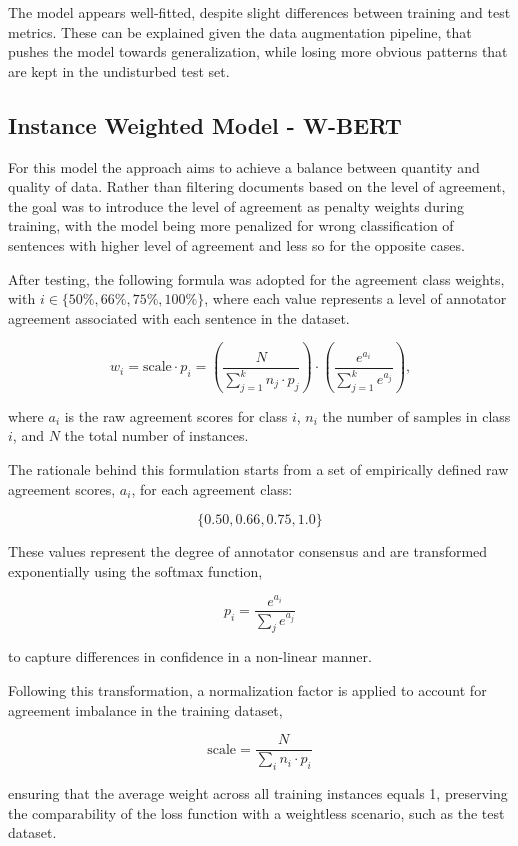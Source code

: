 \documentclass[conference]{IEEEtran}
\begin{document}
The model appears well-fitted, despite slight differences between training and test metrics. These can be explained given the data augmentation pipeline, that pushes the model towards generalization, while losing more obvious patterns that are kept in the undisturbed test set. 

\subsection{Instance Weighted Model - W-BERT}

For this model the approach aims to achieve a balance between quantity and quality of data. Rather than filtering documents based on the level of agreement, the goal was to introduce the level of agreement as penalty weights during training, with the model being more penalized for wrong classification of sentences with higher level of agreement and less so for the opposite cases.

After testing, the following formula was adopted for the agreement class weights, with $i \in \{50\%, 66\%, 75\%, 100\%\}$, where each value represents a level of annotator agreement associated with each sentence in the dataset.

$$
w_i = \text{scale} \cdot p_i = \left( \frac{N}{\sum_{j=1}^k n_j \cdot p_j} \right) \cdot  \left( \frac{e^{a_i}}{\sum_{j=1}^k e^{a_j}} \right) \text{,}
$$

\noindent where $a_i$ is the raw agreement scores for class $i$, $n_i$ the number of samples in class $i$, and $N$ the total number of instances.

The rationale behind this formulation starts from a set of empirically defined raw agreement scores, $a_i$, for each agreement class:

$$
\{0.50, 0.66, 0.75, 1.0\}
$$

These values represent the degree of annotator consensus and are transformed exponentially using the softmax function,

$$
p_i = \frac{e^{a_i}}{\sum_j e^{a_j}}
$$

\noindent to capture differences in confidence in a non-linear manner.

Following this transformation, a normalization factor is applied to account for agreement imbalance in the training dataset,

$$
\text{scale} = \frac{N}{\sum_i n_i \cdot p_i}
$$

\noindent ensuring that the average weight across all training instances equals 1, preserving the comparability of the loss function with a weightless scenario, such as the test dataset.
\end{document}
